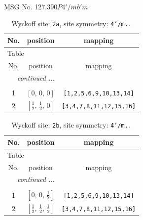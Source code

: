 \documentclass[fleqn,8pt]{jsarticle}
\begin{document}
\setcounter{MaxMatrixCols}{32}

\renewcommand{\tablename}{Table~}
\renewcommand{\figurename}{Figure~}
\begin{center}
\LARGE
MSG No. 127.390\quad$P4'/mb'm$
\end{center}
\renewcommand{\arraystretch}{1.2}
\begin{longtable}{ccc}
\caption{Wyckoff site: {\tt 2a}, site symmetry: {\tt 4'/m..}}
 \\
 \hline \hline
No. & position & mapping \\ \hline \endfirsthead

\multicolumn{2}{l}{\tablename\ \thetable{}} \\
 \hline \hline
No. & position & mapping \\ \hline \endhead

 \hline \hline
\multicolumn{2}{r}{\footnotesize\it continued ...} \\ \endfoot

 \hline \hline
\multicolumn{2}{r}{} \\ \endlastfoot

1 & $\left[ 0,\, 0,\, 0 \right]$ & {\tt [1,2,5,6,9,10,13,14]} \\ \hline
2 & $\left[ \frac{1}{2},\, \frac{1}{2},\, 0 \right]$ & {\tt [3,4,7,8,11,12,15,16]} \\
\end{longtable}
\renewcommand{\arraystretch}{1.2}
\begin{longtable}{ccc}
\caption{Wyckoff site: {\tt 2b}, site symmetry: {\tt 4'/m..}}
 \\
 \hline \hline
No. & position & mapping \\ \hline \endfirsthead

\multicolumn{2}{l}{\tablename\ \thetable{}} \\
 \hline \hline
No. & position & mapping \\ \hline \endhead

 \hline \hline
\multicolumn{2}{r}{\footnotesize\it continued ...} \\ \endfoot

 \hline \hline
\multicolumn{2}{r}{} \\ \endlastfoot

1 & $\left[ 0,\, 0,\, \frac{1}{2} \right]$ & {\tt [1,2,5,6,9,10,13,14]} \\ \hline
2 & $\left[ \frac{1}{2},\, \frac{1}{2},\, \frac{1}{2} \right]$ & {\tt [3,4,7,8,11,12,15,16]} \\
\end{longtable}
\end{document}
